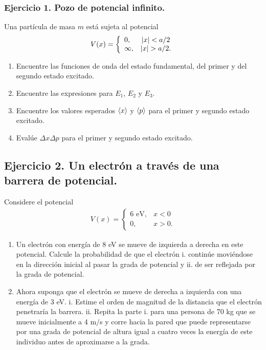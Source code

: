 \documentclass[11pt,letterpaper]{article}
\begin{document}
\subsubsection*{Ejercicio 1. Pozo de potencial infinito.}
Una partícula de masa $m$ está sujeta al potencial 
\begin{align}
V(x)= \left\{ \begin{array}{lc}
             0, &   \abs{x}<a/2 \\
             \infty, &  \abs{x}>a/2. 
             \end{array}
   \right.
\end{align}
\begin{enumerate}
\item Encuentre las funciones de onda del estado fundamental, del primer 
y del segundo estado excitado.
\item Encuentre las expresiones para $E_1$, $E_2$ y $E_3$.
\item Encuentre los valores esperados 
$\expval{x}$ y $\expval{p}$ para el primer y segundo 
estado excitado.
\item Evalúe $\Delta x\Delta p$ para el primer y segundo estado 
excitado.
\end{enumerate}

\subsection*{Ejercicio 2. Un electrón a través de una barrera de potencial.}
Considere el potencial 
\begin{align}
V(x)= \left\{ \begin{array}{lc}
             6\text{ eV}, &   x<0 \\
             0, &  x>0. 
             \end{array}
   \right.
\end{align}
\begin{enumerate}
\item Un electrón con energía de $8$ eV se mueve de izquierda a derecha
en este potencial. Calcule la probabilidad de que el electrón i. continúe 
moviéndose en la dirección inicial al pasar la grada de potencial y 
ii. de ser reflejada por la grada de potencial.
\item Ahora suponga que el electrón se mueve de derecha a izquierda con 
una energía de 3 eV. i. Estime el orden de magnitud de la distancia que 
el electrón penetraría la barrera. ii. Repita la parte i. para una persona
de 70 kg que se mueve inicialmente a 4 m$/$s y corre hacia la pared que 
puede representarse por una grada de potencial de altura igual a cuatro veces
la energía de este individuo antes de aproximarse a la grada. 
\end{enumerate}
\end{document}
